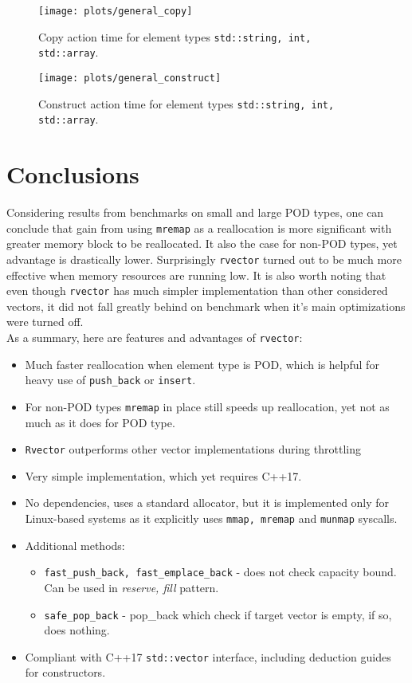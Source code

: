 \documentclass[inz, english, shortabstract]{iithesis}
\begin{document}
\begin{figure}[h!]
\texttt{[image: plots/general\_copy]}
\caption{Copy action time for element types \lstinline{std::string, int, std::array}.}
\label{general_copy}
\end{figure}

\begin{figure}[h!]
\texttt{[image: plots/general\_construct]}
\caption{Construct action time for element types \lstinline{std::string, int, std::array}.}
\label{general_construct}
\end{figure}

\chapter{Conclusions}
Considering results from benchmarks on small and large POD types, one can conclude that gain from using {\tt mremap} as a reallocation is more significant with greater memory block to be reallocated. It also the case for non-POD types, yet advantage is drastically lower. Surprisingly {\tt rvector} turned out to be much more effective when memory resources are running low. It is also worth noting that even though {\tt rvector} has much simpler implementation than other considered vectors, it did not fall greatly behind on benchmark when it's main optimizations were turned off.
\\
As a summary, here are features and advantages of {\tt rvector}:
\begin{itemize}
\item Much faster reallocation when element type is POD, which is helpful for heavy use of {\tt push\_back} or {\tt insert}.
\item For non-POD types {\tt mremap} in place still speeds up reallocation, yet not as much as it does for POD type.
\item {\tt Rvector} outperforms other vector implementations during throttling
\item Very simple implementation, which yet requires C++17.
\item No dependencies, uses a standard allocator, but it is implemented only for Linux-based systems as it explicitly uses {\tt mmap, mremap} and {\tt munmap} syscalls.
\item Additional methods:
	\begin{itemize}
	\item {\tt fast\_push\_back, fast\_emplace\_back} - does not check capacity bound. Can be used in \emph{reserve, fill} pattern.
	\item {\tt safe\_pop\_back} - pop\_back which check if target vector is empty, if so, does nothing.
	\end{itemize}
\item Compliant with C++17 {\tt std::vector} interface, including deduction guides for constructors.
\end{itemize}
\end{document}
